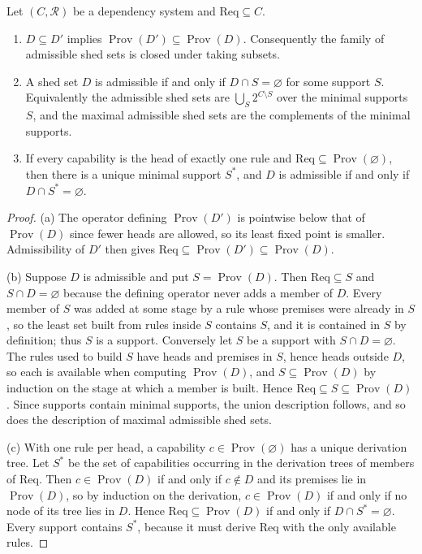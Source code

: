 \begin{newresult}\label{thm:shedding}
Let $(C,\mathcal R)$ be a dependency system and $\mathrm{Req}\subseteq C$.
\begin{enumerate}[nosep,label=(\alph*)]
  \item $D\subseteq D'$ implies $\operatorname{Prov}(D')\subseteq\operatorname{Prov}(D)$. Consequently the family of admissible shed sets is closed under taking subsets.
  \item A shed set $D$ is admissible if and only if $D\cap S=\varnothing$ for some support $S$. Equivalently the admissible shed sets are $\bigcup_{S}2^{C\setminus S}$ over the minimal supports $S$, and the maximal admissible shed sets are the complements of the minimal supports.
  \item If every capability is the head of exactly one rule and $\mathrm{Req}\subseteq\operatorname{Prov}(\varnothing)$, then there is a unique minimal support $S^{*}$, and $D$ is admissible if and only if $D\cap S^{*}=\varnothing$.
\end{enumerate}
\end{newresult}
\begin{proof}
(a) The operator defining $\operatorname{Prov}(D')$ is pointwise below that of $\operatorname{Prov}(D)$ since fewer heads are allowed, so its least fixed point is smaller. Admissibility of $D'$ then gives $\mathrm{Req}\subseteq\operatorname{Prov}(D')\subseteq\operatorname{Prov}(D)$.

(b) Suppose $D$ is admissible and put $S=\operatorname{Prov}(D)$. Then $\mathrm{Req}\subseteq S$ and $S\cap D=\varnothing$ because the defining operator never adds a member of $D$. Every member of $S$ was added at some stage by a rule whose premises were already in $S$, so the least set built from rules inside $S$ contains $S$, and it is contained in $S$ by definition; thus $S$ is a support. Conversely let $S$ be a support with $S\cap D=\varnothing$. The rules used to build $S$ have heads and premises in $S$, hence heads outside $D$, so each is available when computing $\operatorname{Prov}(D)$, and $S\subseteq\operatorname{Prov}(D)$ by induction on the stage at which a member is built. Hence $\mathrm{Req}\subseteq S\subseteq\operatorname{Prov}(D)$. Since supports contain minimal supports, the union description follows, and so does the description of maximal admissible shed sets.

(c) With one rule per head, a capability $c\in\operatorname{Prov}(\varnothing)$ has a unique derivation tree. Let $S^{*}$ be the set of capabilities occurring in the derivation trees of members of $\mathrm{Req}$. Then $c\in\operatorname{Prov}(D)$ if and only if $c\notin D$ and its premises lie in $\operatorname{Prov}(D)$, so by induction on the derivation, $c\in\operatorname{Prov}(D)$ if and only if no node of its tree lies in $D$. Hence $\mathrm{Req}\subseteq\operatorname{Prov}(D)$ if and only if $D\cap S^{*}=\varnothing$. Every support contains $S^{*}$, because it must derive $\mathrm{Req}$ with the only available rules.
\end{proof}

